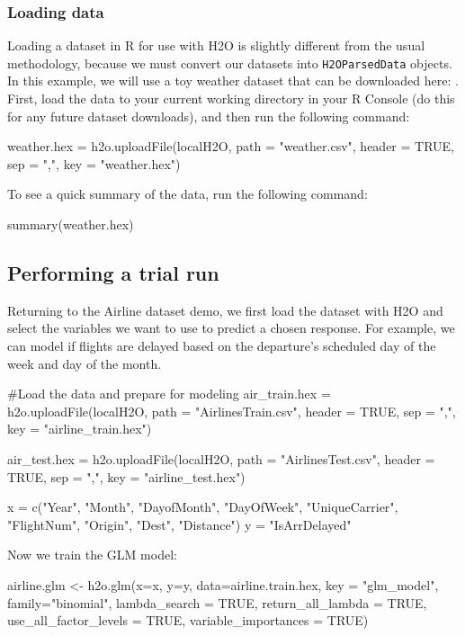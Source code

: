 \documentclass[11pt]{article}
\begin{document}
\subsubsection{Loading data} \label{2.5}

Loading a dataset in R for use with H2O is slightly different from the usual methodology, because we must convert our datasets into \texttt{H2OParsedData} objects. In this example, we will use a toy weather dataset that can be downloaded here: . First, load the data to your current working directory in your R Console (do this for any future dataset downloads), and then run the following command:
\begin{spverbatim}
weather.hex = h2o.uploadFile(localH2O, path = "weather.csv", header = TRUE, sep = ",", key = "weather.hex")
\end{spverbatim}
\bigskip
\noindent
To see a quick summary of the data, run the following command:
\begin{spverbatim}
summary(weather.hex)
\end{spverbatim}


\subsection{Performing a trial run} \label{3.2}
Returning to the Airline dataset demo, we first load the dataset with H2O and select the variables we want to use to predict a chosen response. For example, we can model if flights are delayed based on the departure's scheduled day of the week and day of the month.
\begin{spverbatim}

#Load the data and prepare for modeling
air_train.hex = h2o.uploadFile(localH2O, path = "AirlinesTrain.csv", header = TRUE, sep = ",", key = "airline_train.hex")

air_test.hex = h2o.uploadFile(localH2O, path = "AirlinesTest.csv", header = TRUE, sep = ",", key = "airline_test.hex")

x = c("Year", "Month", "DayofMonth", "DayOfWeek", "UniqueCarrier", "FlightNum", "Origin", "Dest", "Distance")
y = "IsArrDelayed" 

\end{spverbatim}

Now we train the GLM model:

\begin{spverbatim}
airline.glm <- h2o.glm(x=x, 
                     y=y, 
                     data=airline.train.hex,
                     key = "glm_model",
                     family="binomial",
                     lambda_search = TRUE,
                     return_all_lambda = TRUE,
                     use_all_factor_levels = TRUE,
                     variable_importances = TRUE)
\end{spverbatim}
\end{document}
